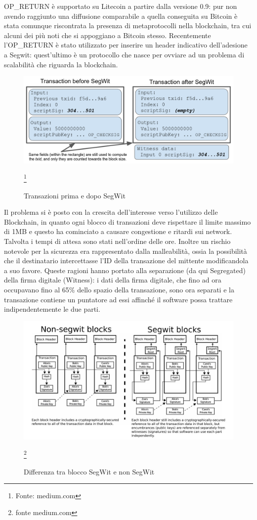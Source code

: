 OP\_RETURN è supportato su Litecoin a partire dalla versione 0.9: pur non avendo raggiunto una diffusione comparabile a quella conseguita su Bitcoin è stata comunque riscontrata la presenza di metaprotocolli nella blockchain, tra cui alcuni dei più noti che si appoggiano a Bitcoin stesso.
Recentemente l’OP\_RETURN è stato utilizzato per inserire un header indicativo dell’adesione a Segwit: quest’ultimo è un protocollo che nasce per ovviare ad un problema di scalabilità che riguarda la blockchain.

\begin{figure}[h!]
	\centering
	\includegraphics[width=1.0\linewidth]{images/before-after-segwit-medium}
	\caption{Transazioni prima e dopo SegWit}
	\label{fig:before-after-segwit-medium}
	\footnote{Fonte: medium.com}
\end{figure}


Il problema si è posto con la crescita dell’interesse verso l’utilizzo delle Blockchain, in quanto ogni blocco di transazioni deve rispettare il limite massimo di 1MB e questo ha cominciato a causare congestione e ritardi sui network. Talvolta i tempi di attesa sono stati nell’ordine delle ore. Inoltre un rischio notevole per la sicurezza era rappresentato dalla malleabilità, ossia la possibilità che il destinatario intercettasse l’ID della transazione del mittente modificandola a suo favore. Queste ragioni hanno portato alla separazione (da qui Segregated) della firma digitale (Witness): i dati della firma digitale, che fino ad ora occupavano fino al 65\% dello spazio della transazione, sono ora separati e la transazione contiene un puntatore ad essi affinché il software possa trattare indipendentemente le due parti.


\begin{figure}[h]
	\centering
	\includegraphics[width=1.0\linewidth]{images/segwitvsnonsegwit-medium}
	\caption{Differenza tra blocco SegWit e non SegWit}
	\label{fig:segwitvsnonsegwit-medium}
	\footnote{fonte medium.com}
\end{figure}


